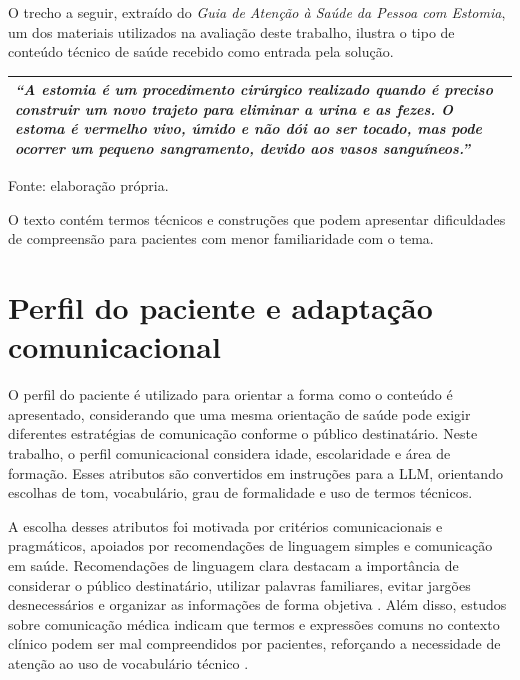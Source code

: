 O trecho a seguir, extraído do \textit{Guia de Atenção à Saúde da Pessoa com Estomia}, um dos materiais utilizados na avaliação deste trabalho, ilustra o tipo de conteúdo técnico de saúde recebido como entrada pela solução.

\begin{quadro}[htbp]
  \centering
  \caption{Exemplo de conteúdo técnico recebido como entrada.}
  \label{qua:entrada-conteudo-estomia}
  \small
  \renewcommand{\arraystretch}{1.2}

  \begin{tabularx}{0.92\textwidth}{X}
    \toprule
    \textit{``A estomia é um procedimento cirúrgico realizado quando é preciso construir um novo trajeto para eliminar a urina e as fezes. O estoma é vermelho vivo, úmido e não dói ao ser tocado, mas pode ocorrer um pequeno sangramento, devido aos vasos sanguíneos.''} \\
    \bottomrule
  \end{tabularx}

  \vspace{0.3em}
  {\small Fonte: elaboração própria.}
\end{quadro}

O texto contém termos técnicos e construções que podem apresentar dificuldades de compreensão para pacientes com menor familiaridade com o tema.

\section{Perfil do paciente e adaptação comunicacional} 
\label{sec:perfil-paciente-adaptacao-comunicacional} 
O perfil do paciente é utilizado para orientar a forma como o conteúdo é apresentado, considerando que uma mesma orientação de saúde pode exigir diferentes estratégias de comunicação conforme o público destinatário. Neste trabalho, o perfil comunicacional considera idade, escolaridade e área de formação. Esses atributos são convertidos em instruções para a LLM, orientando escolhas de tom, vocabulário, grau de formalidade e uso de termos técnicos.

A escolha desses atributos foi motivada por critérios comunicacionais e pragmáticos, apoiados por recomendações de linguagem simples e comunicação em saúde. Recomendações de linguagem clara destacam a importância de considerar o público destinatário, utilizar palavras familiares, evitar jargões desnecessários e organizar as informações de forma objetiva \cite{cdc2025plainlanguage}. Além disso, estudos sobre comunicação médica indicam que termos e expressões comuns no contexto clínico podem ser mal compreendidos por pacientes, reforçando a necessidade de atenção ao uso de vocabulário técnico \cite{gotlieb2022medicaljargon}.

